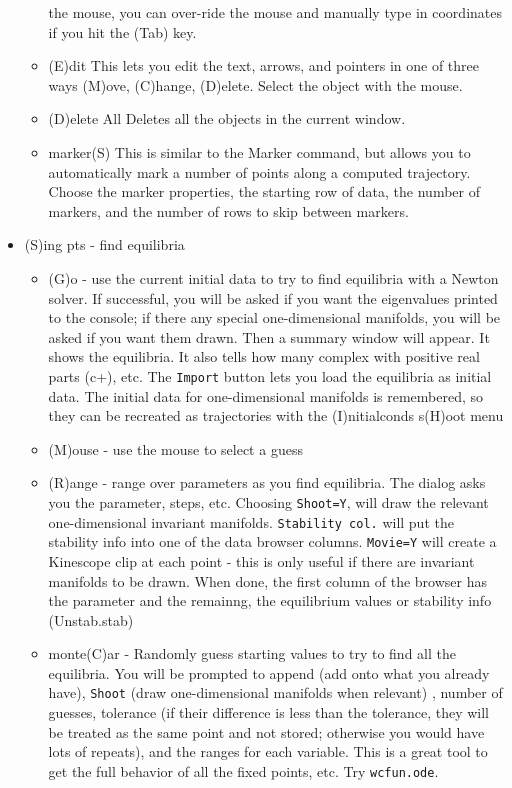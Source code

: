 \documentclass{article}
\begin{document}
\begin{itemize}
\begin{itemize}
the mouse, you can over-ride the mouse and manually type in
coordinates if you hit the (Tab) key.
\item (E)dit This lets you edit the text, arrows, and pointers in one of three ways (M)ove, (C)hange, (D)elete. Select the object with the mouse.
\item (D)elete All Deletes all the objects in the current window.
\item marker(S) This is similar to the Marker command, but allows you to
automatically mark a number of points along a computed trajectory. 
Choose the marker properties, the starting row of data, the number of markers, and the number of rows to skip between markers.
\end{itemize}
\item (S)ing pts - find equilibria
\begin{itemize}
\item (G)o - use the current initial data to try to find equilibria with a Newton solver. If successful, you will be asked if you want the eigenvalues printed to the console; if there any special one-dimensional manifolds, you will be asked if you want them drawn. Then a summary window will appear. It shows the equilibria. It also tells how many complex with positive real parts (c+), etc. The {\tt Import} button lets you load the equilibria as initial data. The initial data for one-dimensional manifolds is remembered, so they can be recreated as trajectories with the (I)nitialconds s(H)oot menu
\item (M)ouse - use the mouse to select a guess
\item (R)ange - range over parameters as you find equilibria. The dialog asks you the parameter, steps, etc. Choosing {\tt Shoot=Y}, will draw the relevant one-dimensional invariant manifolds. {\tt Stability col.} will put the stability info into one of the data browser columns. {\tt Movie=Y} will create a Kinescope clip at each point - this is only useful if there are invariant manifolds to be drawn. When done, the first column of the browser has the parameter and the remainng, the equilibrium values or stability info (Unstab.stab) 
\item monte(C)ar - Randomly guess starting values to try to find all the equilibria. You will be prompted to append (add onto what you already have), {\tt Shoot} (draw one-dimensional manifolds when relevant) ,  number of guesses, tolerance (if their difference is less than the tolerance, they will be treated as the same point and not stored; otherwise you would have lots of repeats), and the ranges for each variable. This is a great tool to get the full behavior of all the fixed points, etc. Try {\tt wcfun.ode}.

\end{itemize}
\end{itemize}
\end{document}

